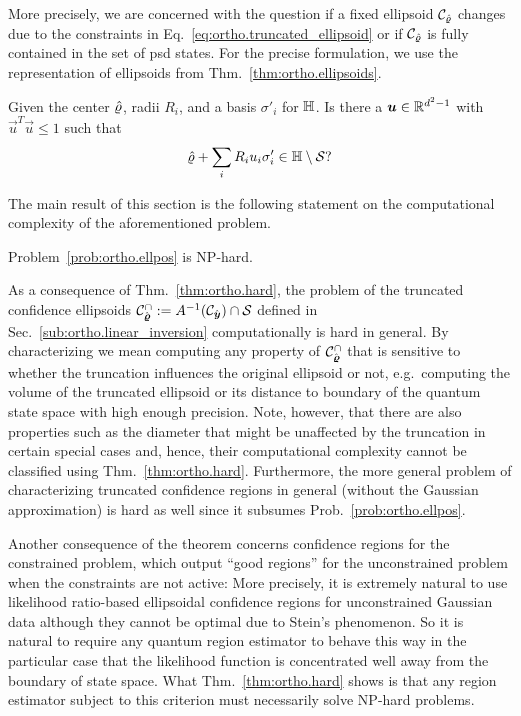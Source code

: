 More precisely, we are concerned with the question if a fixed ellipsoid $\mathcal{C}_{\hat{\varrho}}$ changes due to the constraints in Eq.~\eqref{eq:ortho.truncated_ellipsoid} or if $\mathcal{C}_{\hat{\varrho}}$ is fully contained in the set of psd states.
For the precise formulation, we use the representation of ellipsoids from Thm.~\ref{thm:ortho.ellipsoids}.
\begin{problem}\label{prob:ortho.ellpos}
  Given the center $\hat{\varrho}$, radii $R_i$, and a basis $\sigma'_i$ for $\mathbb{H}$.
  Is there a $\boldsymbol{u} \in \mathbb{R}^{d^2 - 1}$ with $\vec{u}^{T}\vec{u} \leq 1$ such that
  \[
    \hat{\varrho} + \sum_{i}R_{i}u_{i}\sigma_{i}' \in \mathbb{H} \setminus \mathcal{S}?
  \]
\end{problem}
The main result of this section is the following statement on the computational complexity of the aforementioned problem.
\begin{theorem}\label{thm:ortho.hard}
  Problem~\ref{prob:ortho.ellpos} is NP-hard.
\end{theorem}
As a consequence of Thm.~\ref{thm:ortho.hard}, the problem of  the truncated confidence ellipsoids $\mathcal{C}_{\hat{\boldsymbol{\varrho}}}^\cap := A^{-1}(\mathcal{C}_{\hat{\boldsymbol{y}}}) \cap \mathcal{S}$ defined in Sec.~\ref{sub:ortho.linear_inversion} computationally is hard in general.
By characterizing we mean computing any property of $\mathcal{C}_{\hat{\boldsymbol{\varrho}}}^\cap$ that is sensitive to whether the truncation influences the original ellipsoid or not, e.g.\ computing the volume of the truncated ellipsoid or its distance to boundary of the quantum state space with high enough precision.
Note, however, that there are also properties such as the diameter that might be unaffected by the truncation in certain special cases and, hence, their computational complexity cannot be classified using Thm.~\ref{thm:ortho.hard}.
Furthermore, the more general problem of characterizing truncated confidence regions in general (without the Gaussian approximation) is hard as well since it subsumes Prob.~\ref{prob:ortho.ellpos}.

Another consequence of the theorem concerns confidence regions for the constrained problem, which output ``good regions'' for the unconstrained problem when the constraints are not active:
More precisely, it is extremely natural to use likelihood ratio-based ellipsoidal confidence regions for unconstrained Gaussian data although they cannot be optimal due to Stein's phenomenon.
So it is natural to require any quantum region estimator to behave this way in the particular case that the likelihood function is concentrated well away from the boundary of state space.
What Thm.~\ref{thm:ortho.hard} shows is that any region estimator subject to this criterion must necessarily solve NP-hard problems.\\


